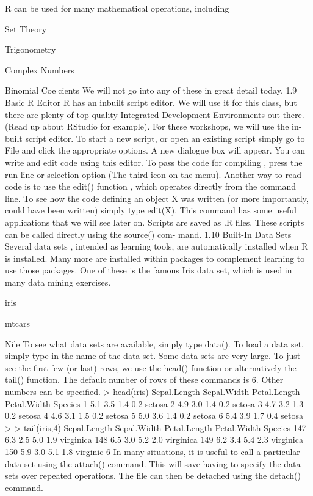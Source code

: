 R can be used for many mathematical operations, including
\item Set Theory
\item Trigonometry
\item Complex Numbers
\item Binomial Coecients
We will not go into any of these in great detail today.
1.9 Basic R Editor
R has an inbuilt script editor. We will use it for this class, but there are plenty of top quality
Integrated Development Environments out there. (Read up about RStudio for example).
For these workshops, we will use the in-built script editor.
To start a new script, or open an existing script simply go to File and click the appropriate
options. A new dialogue box will appear. You can write and edit code using this editor.
To pass the code for compiling , press the run line or selection option (The third icon
on the menu).
Another way to read code is to use the edit() function , which operates directly from the
command line. To see how the code defining an object X was written (or more importantly,
could have been written) simply type edit(X). This command has some useful applications
that we will see later on.
Scripts are saved as .R files. These scripts can be called directly using the source() com-
mand.
1.10 Built-In Data Sets
Several data sets , intended as learning tools, are automatically installed when R is installed.
Many more are installed within packages to complement learning to use those packages. One
of these is the famous Iris data set, which is used in many data mining exercises.
\item iris
\item mtcars
\item Nile
To see what data sets are available, simply type data(). To load a data set, simply type in the
name of the data set. Some data sets are very large. To just see the first few (or last) rows, we
use the head() function or alternatively the tail() function. The default number of rows of
these commands is 6. Other numbers can be specified.
> head(iris)
Sepal.Length Sepal.Width Petal.Length Petal.Width Species
1 5.1 3.5 1.4 0.2 setosa
2 4.9 3.0 1.4 0.2 setosa
3 4.7 3.2 1.3 0.2 setosa
4 4.6 3.1 1.5 0.2 setosa
5 5.0 3.6 1.4 0.2 setosa
6 5.4 3.9 1.7 0.4 setosa
>
> tail(iris,4)
Sepal.Length Sepal.Width Petal.Length Petal.Width Species
147 6.3 2.5 5.0 1.9 virginica
148 6.5 3.0 5.2 2.0 virginica
149 6.2 3.4 5.4 2.3 virginica
150 5.9 3.0 5.1 1.8 virginic
6
In many situations, it is useful to call a particular data set using the attach() command. This
will save having to specify the data sets over repeated operations. The file can then be detached
using the detach() command.

